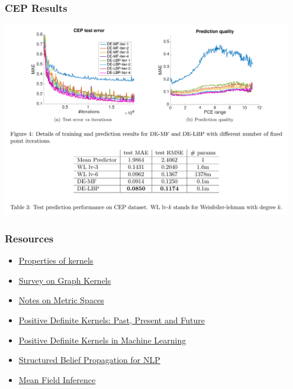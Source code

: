 \documentclass{beamer}
\begin{document}
    \begin{frame}
        \frametitle{CEP Results}
        \begin{center}
            \includegraphics[width=0.95\textwidth]{cep_results.png}
        \end{center}
    \end{frame}

    \begin{frame}
        \frametitle{Resources}
        \begin{itemize}
            \item \href{https://people.eecs.berkeley.edu/~jordan/kernels/0521813972c03_p47-84.pdf}{Properties of kernels}
            \item \href{https://arxiv.org/pdf/1903.11835.pdf}{Survey on Graph Kernels}
            \item \href{https://www.cs.mcgill.ca/~prakash/Courses/599/Notes/metric_spaces.pdf}{Notes on Metric Spaces}
            \item \href{http://www.math.iit.edu/~fass/PDKernels.pdf}{Positive Definite Kernels: Past, Present and Future}
            \item \href{https://marcocuturi.net/Papers/pdk_in_ml.pdf}{Positive Definite Kernels in Machine Learning}
            \item \href{http://www.cs.cmu.edu/~mgormley/bp-tutorial/}{Structured Belief Propagation for NLP}
            \item \href{http://luthuli.cs.uiuc.edu/~daf/courses/AutonomousCars/autoencodernotes.pdf}{Mean Field Inference}
        \end{itemize}
    \end{frame}
%        
\end{document}
